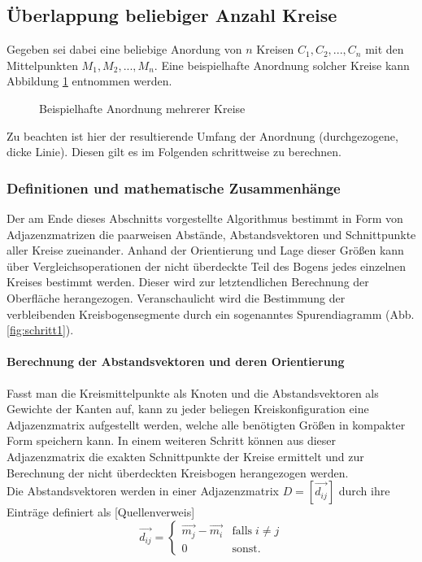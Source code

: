 \documentclass[accentcolor=tud1c, 11pt, toc=bib, toc=listof, captions=abovetable, parskip=half]{tudreport}
\begin{document}
\subsection{Überlappung beliebiger Anzahl Kreise}
\label{subsec:beliebigeAnzahlKreise} 

Gegeben sei dabei eine beliebige Anordung von $n$ Kreisen $C_1, C_2,...,C_n$ mit den Mittelpunkten $M_1, M_2,...,M_n$. Eine beispielhafte Anordnung solcher Kreise kann Abbildung \ref{img:5Kreise} entnommen werden.\\ 

\begin{figure}[h!]
\centering

\caption{Beispielhafte Anordnung mehrerer Kreise}
\label{img:5Kreise}
\end{figure}

Zu beachten ist hier der resultierende Umfang der Anordnung (durchgezogene, dicke Linie). Diesen gilt es im Folgenden schrittweise zu berechnen.

\subsubsection{Definitionen und mathematische Zusammenhänge}
Der am Ende dieses Abschnitts vorgestellte Algorithmus bestimmt in Form von Adjazenzmatrizen die paarweisen Abstände, Abstandsvektoren und Schnittpunkte aller Kreise zueinander. Anhand der Orientierung und Lage dieser Größen kann über Vergleichsoperationen der nicht überdeckte Teil des Bogens jedes einzelnen Kreises bestimmt werden. Dieser wird zur letztendlichen Berechnung der Oberfläche herangezogen. Veranschaulicht wird die Bestimmung der verbleibenden Kreisbogensegmente durch ein sogenanntes Spurendiagramm (Abb. \ref{fig:schritt1}).

\paragraph{Berechnung der Abstandsvektoren und deren Orientierung}
Fasst man die Kreismittelpunkte als Knoten und die Abstandsvektoren als Gewichte der Kanten auf, kann zu jeder beliegen Kreiskonfiguration eine Adjazenzmatrix aufgestellt werden, welche alle benötigten Größen in kompakter Form speichern kann. In einem weiteren Schritt können aus dieser Adjazenzmatrix die exakten Schnittpunkte der Kreise ermittelt und zur Berechnung der nicht überdeckten Kreisbogen herangezogen werden.\\
Die Abstandsvektoren werden in einer Adjazenzmatrix $D = \left[ \vec{d_{ij}} \right]$ durch ihre Einträge definiert als [Quellenverweis]\\
\begin{equation} 
\vec{d_{ij}} = 
\begin{cases} 
      \vec{m_j} - \vec{m_i} 	& \text{falls} \; i \neq j \\
      0						& \text{sonst}.
\end{cases}
\end{equation}
\end{document}
